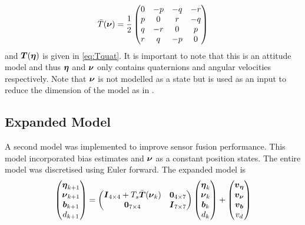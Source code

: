 \begin{equation}
\bar{T}(\boldsymbol{\nu}) = \frac{1}{2}
\begin{pmatrix}
     0 &-p &-q &-r\\
     p & 0 & r &-q\\
     q &-r & 0 & p\\
     r & q &-p & 0
\end{pmatrix}
\end{equation} and $\boldsymbol{T}(\boldsymbol{\eta})$ is given in \eqref{eq:Tquat}.
It is important to note that this is an attitude model and thus $\boldsymbol{\eta}$ and $\boldsymbol{\nu}$ only contains quaternions and angular velocities respectively. Note that $\boldsymbol{\nu}$ is not modelled as a state but is used as an input to reduce the dimension of the model as in \citet{Tornqvist}. 
\subsection{Expanded Model}\label{sec:expanded_model}
A second model was implemented to improve sensor fusion performance. This model incorporated bias estimates and $\boldsymbol{\nu}$ as a constant position states. The entire model was discretised using Euler forward. The expanded model is 
\begin{equation}\label{eq:expanded_model}
\begin{pmatrix}
\boldsymbol{\eta}_{k+1}\\
\boldsymbol{\nu}_{k+1}\\
\boldsymbol{b}_{k+1}\\
d_{k+1}
\end{pmatrix}=
\begin{pmatrix}
\boldsymbol{I}_{4\times4} + T_s \bar{\boldsymbol{T}}(\boldsymbol{\nu}_{k})& \boldsymbol{0}_{4\times7}\\
\boldsymbol{0}_{7\times4} & \boldsymbol{I}_{7\times7}\\
\end{pmatrix}
\begin{pmatrix}
\boldsymbol{\eta}_{k}\\
\boldsymbol{\nu}_{k}\\
\boldsymbol{b}_{k}\\
d_{k}
\end{pmatrix}
+\begin{pmatrix}
  \boldsymbol{v}_{\boldsymbol{\eta}}\\
  \boldsymbol{v}_{\boldsymbol{\nu}}\\
  \boldsymbol{v}_{\boldsymbol{b}}\\
  v_d 
\end{pmatrix}
\end{equation}


